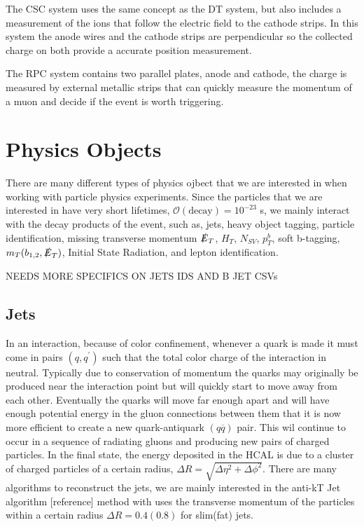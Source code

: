 The CSC system uses the same concept as the DT system, but also includes a measurement of the ions that follow the electric field to the cathode strips. In this system the anode wires and the cathode strips are perpendicular so the collected charge on both provide a accurate position measurement. 

The RPC system contains two parallel plates, anode and cathode, the charge is measured by external metallic strips that can quickly measure the momentum of a muon and decide if the event is worth triggering.

\section{Physics Objects}\label{PhysObj}
There are many different types of physics ojbect that we are interested in when working with particle physics experiments. Since the particles that we are interested in have very short lifetimes, $\mathcal{O}(\text{decay})=10^{-23}$ s, we mainly interact with the decay products of the event, such as, jets, heavy object tagging, particle identification, missing transverse momentum $\slashed{E}_{T}$, $H_T$, $N_{SV}$, $p_T^b$, soft b-tagging, $m_T(b_{1,2}, \slashed{E}_{T})$, Initial State Radiation, and lepton identification.

NEEDS MORE SPECIFICS ON JETS IDS AND B JET CSVs

\subsection{Jets}\label{Jets}
In an interaction, because of color confinement, whenever a quark is made it must come in pairs $(q, q^\prime)$ such that the total color charge of the interaction in neutral. Typically due to conservation of momentum the quarks may originally be produced near the interaction point but will quickly start to move away from each other. Eventually the quarks will move far enough apart and will have enough potential energy in the gluon connections between them that it is now more efficient to create a new quark-antiquark $(q\overline{q})$ pair. This wil continue to occur in a sequence of radiating gluons and producing new pairs of charged particles. In the final state, the energy deposited in the HCAL is due to a cluster of charged particles of a certain radius, $\Delta R=\sqrt{\Delta\eta^2+\Delta\phi^2}$. There are many algorithms to reconstruct the jets, we are mainly interested in the anti-kT Jet algorithm [reference] method with uses the transverse momentum of the particles within a certain radius $\Delta R = 0.4 (0.8)$ for slim(fat) jets. 

